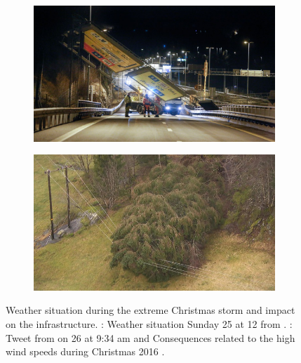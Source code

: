 \begin{figure}[t!]
\begin{subfigure}[b]{0.49\textwidth}
		\includegraphics[width=\textwidth]{./fig_introduction/street_sign_2512.jpg}
		\caption{}\label{fig:street_sign}
	\end{subfigure}
	\hfill
	\begin{subfigure}[b]{0.49\textwidth}
		\includegraphics[width=\textwidth]{./fig_introduction/tree_nrk_2812.jpg}
		\caption{}\label{fig:tree_elec}
	\end{subfigure}
	\caption{Weather situation during the extreme Christmas storm and impact on the infrastructure. \protect{}: Weather situation Sunday \SI{25}{\dec} at \SI{12}{\UTC} from 
		\citep{olsen_ekstremvaerrapport._2017}.
		\protect{}: Tweet from \cite{meteorologene_her_2016} on \SI{26}{\dec} at 9:34 am
		\protect{} and \protect{} %
		Consequences related to the high wind speeds during Christmas 2016 \citep{ruud_tonn_2016,farestveit_80.000_2016}.
	} \label{fig:news}
\end{figure}